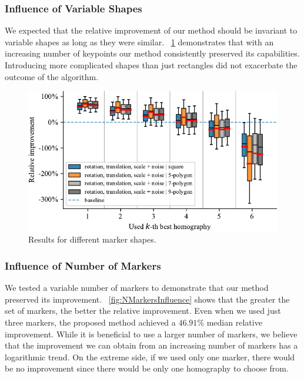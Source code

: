 \subsubsection{Influence of Variable Shapes}

We expected that the relative improvement of our method should be invariant to variable shapes as long as they were similar. \figtext{}~\ref{fig:ShapeInfluence} demonstrates that with an increasing number of keypoints our method consistently preserved its capabilities. Introducing more complicated shapes than just rectangles did not exacerbate the outcome of the algorithm.

\begin{figure}[t]
    \centering
    \includegraphics[width=\boxplotimgwidth]{figures/homography/shape_influence.pdf}
    \caption[Influence of marker shape]{Results for different marker shapes.}
    \label{fig:ShapeInfluence}
\end{figure}

\subsubsection{Influence of Number of Markers}

We tested a variable number of markers to demonstrate that our method preserved its improvement. \figtext{}~\ref{fig:NMarkersInfluence} shows that the greater the set of markers, the better the relative improvement. Even when we used just three markers, the proposed method achieved a $46.91$\% median relative improvement. While it is beneficial to use a larger number of markers, we believe that the improvement we can obtain from an increasing number of markers has a logarithmic trend. On the extreme side, if we used only one marker, there would be no improvement since there would be only one homography to choose from.

